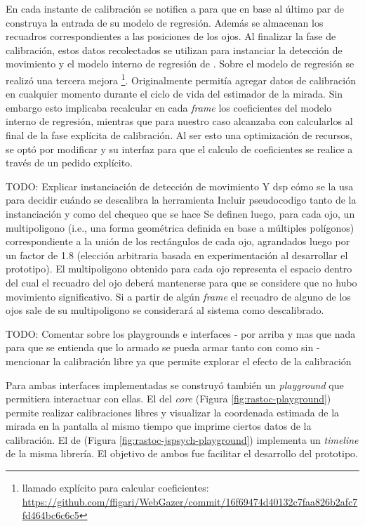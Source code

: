   En cada instante de calibración se notifica a \webgazer para que en base al
  último par de \features construya la entrada de su modelo de regresión.
  Además se almacenan los recuadros correspondientes a las posiciones de los
  ojos.
  Al finalizar la fase de calibración, estos datos recolectados se utilizan para
  instanciar la detección de movimiento y el modelo interno de regresión de
  \webgazer.
  Sobre el modelo de regresión se realizó una tercera mejora \footnote{llamado
  explícito para calcular coeficientes:
  \url{https://github.com/ffigari/WebGazer/commit/16f69474d40132c7faa826b2afc7fd464bc6c6c5}}.
  Originalmente \webgazer permitía agregar datos de calibración en cualquier
  momento durante el ciclo de vida del estimador de la mirada.
  Sin embargo esto implicaba recalcular en cada \textit{frame} los coeficientes
  del modelo interno de regresión, mientras que para nuestro caso alcanzaba con
  calcularlos al final de la fase explícita de calibración.
  Al ser esto una optimización de recursos, se optó por modificar \webgazer y su
  interfaz para que el calculo de coeficientes se realice a través de un pedido
  explícito.

  TODO: Explicar instanciación de detección de movimiento
        Y dsp cómo se la usa para decidir cuándo se descalibra la herramienta
        Incluir pseudocodigo tanto de la instanciación y como del chequeo que se
        hace
  Se definen luego, para cada ojo, un multipoligono (i.e., una forma geométrica
  definida en base a múltiples polígonos) correspondiente a la unión de los
  rectángulos de cada ojo, agrandados luego por un factor de 1.8 (elección
  arbitraria basada en experimentación al desarrollar el prototipo).
  El multipoligono obtenido para cada ojo representa el espacio dentro del cual
  el recuadro del ojo deberá mantenerse para que se considere que no hubo
  movimiento significativo.
  Si a partir de algún \textit{frame} el recuadro de alguno de los ojos sale de
  su multipoligono se considerará al sistema como descalibrado.

  TODO: Comentar sobre los playgrounds e interfaces
    - por arriba y mas que nada para que se entienda que lo armado se pueda armar
    tanto con como sin \jspsych
    - mencionar la calibración libre ya que permite explorar el efecto de la
    calibración

  Para ambas interfaces implementadas se construyó también un \textit{playground}
  que permitiera interactuar con ellas.
  El del \textit{core} (Figura \ref{fig:rastoc-playground}) permite realizar
  calibraciones libres y visualizar la coordenada estimada de la mirada en la
  pantalla al mismo tiempo que imprime ciertos datos de la calibración.
  El de \jspsych (Figura \ref{fig:rastoc-jspsych-playground}) implementa un
  \textit{timeline} de la misma librería.
  El objetivo de ambos fue facilitar el desarrollo del prototipo.

